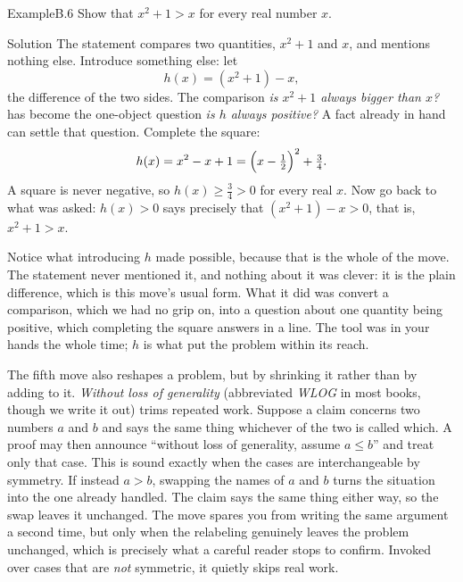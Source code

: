 \documentclass[a4paper,12pt,oneside]{memoir}
\begin{document}
\begin{workedexample}
\begin{envexample}{Example}{B.6}{}
Show that \(x^{2} + 1 > x\) for every real number \(x\).
\end{envexample}
\begin{envsolution}{Solution}{}{}
The statement compares two quantities, \(x^{2} + 1\) and \(x\), and mentions nothing else. Introduce something else: let \[ h(x) = (x^{2} + 1) - x, \] the difference of the two sides. The comparison \emph{is \(x^{2}+1\) always bigger than \(x\)?} has become the one-object question \emph{is \(h\) always positive?} A fact already in hand can settle that question. Complete the square: \[ h(x) = x^{2} - x + 1 = \Bigl(x - \tfrac{1}{2}\Bigr)^{2} + \tfrac{3}{4}. \] A square is never negative, so \(h(x) \ge \tfrac{3}{4} > 0\) for every real \(x\). Now go back to what was asked: \(h(x) > 0\) says precisely that \((x^{2} + 1) - x > 0\), that is, \(x^{2} + 1 > x\).

Notice what introducing \(h\) made possible, because that is the whole of the move. The statement never mentioned it, and nothing about it was clever: it is the plain difference, which is this move’s usual form. What it did was convert a comparison, which we had no grip on, into a question about one quantity being positive, which completing the square answers in a line. The tool was in your hands the whole time; \(h\) is what put the problem within its reach.
\end{envsolution}
\end{workedexample}
The fifth move also reshapes a problem, but by shrinking it rather than by adding to it. \emph{Without loss of generality} (abbreviated \emph{WLOG} in most books, though we write it out) trims repeated work. Suppose a claim concerns two numbers \(a\) and \(b\) and says the same thing whichever of the two is called which. A proof may then announce “without loss of generality, assume \(a \le b\)” and treat only that case. This is sound exactly when the cases are interchangeable by symmetry. If instead \(a > b\), swapping the names of \(a\) and \(b\) turns the situation into the one already handled. The claim says the same thing either way, so the swap leaves it unchanged. The move spares you from writing the same argument a second time, but only when the relabeling genuinely leaves the problem unchanged, which is precisely what a careful reader stops to confirm. Invoked over cases that are \emph{not} symmetric, it quietly skips real work.
\end{document}
